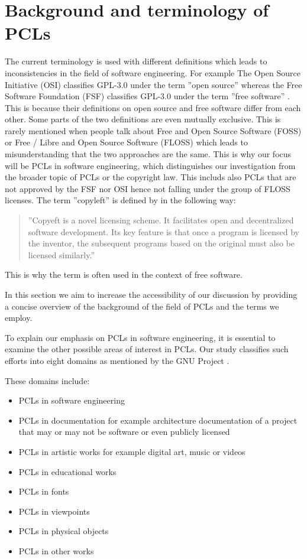 \section{Background and terminology of PCLs}
\label{sec:bg}
The current terminology is used with different definitions which leads to inconsistencies in the field of software engineering. For example The Open Source Initiative (OSI) classifies GPL-3.0 under the term ''open source'' whereas the Free Software Foundation (FSF) classifies GPL-3.0 under the term ''free software'' \citep{osi:gplv3}\citep{rms:opensource}. This is because their definitions on open source and free software differ from each other. Some parts of the two definitions are even mutually exclusive. This is rarely mentioned when people talk about Free and Open Source Software (FOSS) or Free / Libre and Open Source Software (FLOSS) which leads to misunderstanding that the two approaches are the same. This is why our focus will be PCLs in software engineering, which distinguishes our investigation from the broader topic of PCLs or the copyright law. This includs also PCLs that are not approved by the FSF nor OSI hence not falling under the group of FLOSS licenses. The term ''copyleft'' is defined by \cite{mustonen2003} in the following way:
\begin{quote}
	''Copyeft is a novel licensing scheme. It facilitates open and decentralized software development. Its key feature is that once a program is licensed by the inventor, the subsequent programs based on the original must also be licensed similarly.''
\end{quote}
This is why the term is often used in the context of free software.

In this section we aim to increase the accessibility of our discussion by providing  a concise overview of the background of the field of PCLs and the terms we employ.

To explain our emphasis on PCLs in software engineering, it is essential to examine the other possible areas of interest in PCLs. Our study classifies such efforts into eight domains as mentioned by the GNU Project \citep{gnu:licenselist}.

These domains include:
\begin{itemize}
	\item PCLs in software engineering
	\item PCLs in documentation for example architecture documentation of a project that may or may not be software or even publicly licensed
	\item PCLs in artistic works for example digital art, music or videos
	\item PCLs in educational works
	\item PCLs in fonts
	\item PCLs in viewpoints
	\item PCLs in physical objects
	\item PCLs in other works
\end{itemize}

